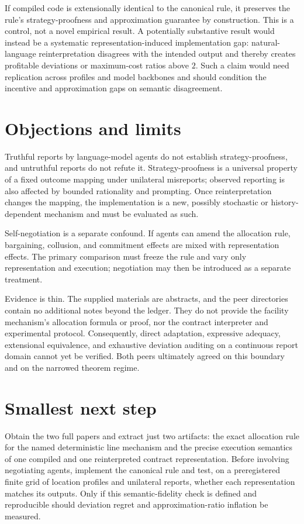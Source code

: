 \documentclass{article}
\begin{document}
If compiled code is extensionally identical to the canonical rule, it preserves the rule's strategy-proofness and approximation guarantee by construction.  This is a control, not a novel empirical result.  A potentially substantive result would instead be a systematic representation-induced implementation gap: natural-language reinterpretation disagrees with the intended output and thereby creates profitable deviations or maximum-cost ratios above \(2\).  Such a claim would need replication across profiles and model backbones and should condition the incentive and approximation gaps on semantic disagreement. 

\section{Objections and limits}

Truthful reports by language-model agents do not establish strategy-proofness, and untruthful reports do not refute it.  Strategy-proofness is a universal property of a fixed outcome mapping under unilateral misreports; observed reporting is also affected by bounded rationality and prompting.  Once reinterpretation changes the mapping, the implementation is a new, possibly stochastic or history-dependent mechanism and must be evaluated as such. 

Self-negotiation is a separate confound.  If agents can amend the allocation rule, bargaining, collusion, and commitment effects are mixed with representation effects.  The primary comparison must freeze the rule and vary only representation and execution; negotiation may then be introduced as a separate treatment. 

Evidence is thin.  The supplied materials are abstracts, and the peer directories contain no additional notes beyond the ledger.  They do not provide the facility mechanism's allocation formula or proof, nor the contract interpreter and experimental protocol.  Consequently, direct adaptation, expressive adequacy, extensional equivalence, and exhaustive deviation auditing on a continuous report domain cannot yet be verified.  Both peers ultimately agreed on this boundary and on the narrowed theorem regime. 

\section{Smallest next step}

Obtain the two full papers and extract just two artifacts: the exact allocation rule for the named deterministic line mechanism and the precise execution semantics of one compiled and one reinterpreted contract representation.  Before involving negotiating agents, implement the canonical rule and test, on a preregistered finite grid of location profiles and unilateral reports, whether each representation matches its outputs.  Only if this semantic-fidelity check is defined and reproducible should deviation regret and approximation-ratio inflation be measured. 
\end{document}
